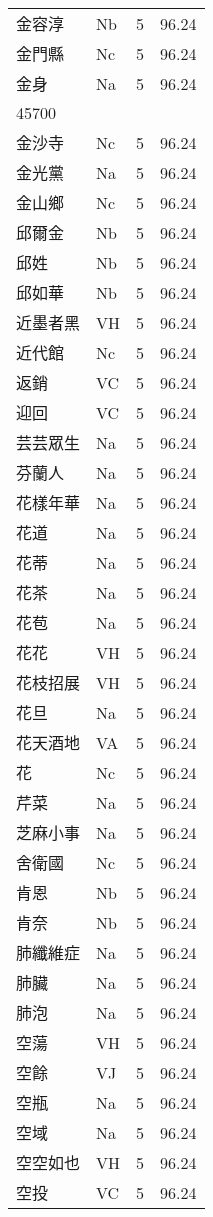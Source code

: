 \documentclass[twocolumn]{book}
\begin{document}
\begin{supertabular}{llrr}
金容淳 & Nb & 5 &  96.24\\
金門縣 & Nc & 5 &  96.24\\
金身 & Na & 5 &  96.24\\
45700\\
金沙寺 & Nc & 5 &  96.24\\
金光黨 & Na & 5 &  96.24\\
金山鄉 & Nc & 5 &  96.24\\
邱爾金 & Nb & 5 &  96.24\\
邱姓 & Nb & 5 &  96.24\\
邱如華 & Nb & 5 &  96.24\\
近墨者黑 & VH & 5 &  96.24\\
近代館 & Nc & 5 &  96.24\\
返銷 & VC & 5 &  96.24\\
迎回 & VC & 5 &  96.24\\
芸芸眾生 & Na & 5 &  96.24\\
芬蘭人 & Na & 5 &  96.24\\
花樣年華 & Na & 5 &  96.24\\
花道 & Na & 5 &  96.24\\
花蒂 & Na & 5 &  96.24\\
花茶 & Na & 5 &  96.24\\
花苞 & Na & 5 &  96.24\\
花花 & VH & 5 &  96.24\\
花枝招展 & VH & 5 &  96.24\\
花旦 & Na & 5 &  96.24\\
花天酒地 & VA & 5 &  96.24\\
花 & Nc & 5 &  96.24\\
芹菜 & Na & 5 &  96.24\\
芝麻小事 & Na & 5 &  96.24\\
舍衛國 & Nc & 5 &  96.24\\
肯恩 & Nb & 5 &  96.24\\
肯奈 & Nb & 5 &  96.24\\
肺纖維症 & Na & 5 &  96.24\\
肺臟 & Na & 5 &  96.24\\
肺泡 & Na & 5 &  96.24\\
空蕩 & VH & 5 &  96.24\\
空餘 & VJ & 5 &  96.24\\
空瓶 & Na & 5 &  96.24\\
空域 & Na & 5 &  96.24\\
空空如也 & VH & 5 &  96.24\\
空投 & VC & 5 &  96.24\\

\end{supertabular}
\end{document}
